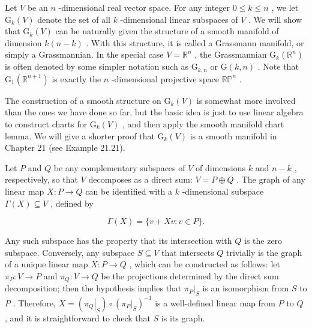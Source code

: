 \begin{example}
\label{ex:1-36}
\leanok
{}
Let $V$ be an $n$ -dimensional real vector space. For any integer $0 \leq  k \leq  n$ , we let ${\mathrm{G}}_{k}\left( V\right)$ denote the set of all $k$ -dimensional linear subspaces of $V$ . We will show that ${\mathrm{G}}_{k}\left( V\right)$ can be naturally given the structure of a smooth manifold of dimension $k\left( {n - k}\right)$ . With this structure, it is called a Grassmann manifold, or simply a Grassmannian. In the special case $V = {\mathbb{R}}^{n}$ , the Grassmannian ${\mathrm{G}}_{k}\left( {\mathbb{R}}^{n}\right)$ is often denoted by some simpler notation such as ${\mathrm{G}}_{k, n}$ or $\mathrm{G}\left( {k, n}\right)$ . Note that ${\mathrm{G}}_{1}\left( {\mathbb{R}}^{n + 1}\right)$ is exactly the $n$ -dimensional projective space ${\mathbb{{RP}}}^{n}$ .

The construction of a smooth structure on ${\mathrm{G}}_{k}\left( V\right)$ is somewhat more involved than the ones we have done so far, but the basic idea is just to use linear algebra to construct charts for ${\mathrm{G}}_{k}\left( V\right)$ , and then apply the smooth manifold chart lemma. We will give a shorter proof that ${\mathrm{G}}_{k}\left( V\right)$ is a smooth manifold in Chapter 21 (see Example 21.21).

Let $P$ and $Q$ be any complementary subspaces of $V$ of dimensions $k$ and $n - k$ , respectively, so that $V$ decomposes as a direct sum: $V = P \oplus  Q$ . The graph of any linear map $X : P \rightarrow  Q$ can be identified with a $k$ -dimensional subspace $\Gamma \left( X\right)  \subseteq  V$ , defined by

\[
\Gamma \left( X\right)  = \{ v + {Xv} : v \in  P\} .
\]

Any such subspace has the property that its intersection with $Q$ is the zero subspace. Conversely, any subspace $S \subseteq  V$ that intersects $Q$ trivially is the graph of a unique linear map $X : P \rightarrow  Q$ , which can be constructed as follows: let ${\pi }_{P} : V \rightarrow  P$ and ${\pi }_{Q} : V \rightarrow  Q$ be the projections determined by the direct sum decomposition; then the hypothesis implies that ${\left. {\pi }_{P}\right| }_{S}$ is an isomorphism from $S$ to $P$ . Therefore, $X = \left( {\left. {\pi }_{Q}\right| }_{S}\right)  \circ  {\left( {\left. {\pi }_{P}\right| }_{S}\right) }^{-1}$ is a well-defined linear map from $P$ to $Q$ , and it is straightforward to check that $S$ is its graph.


\end{example}
